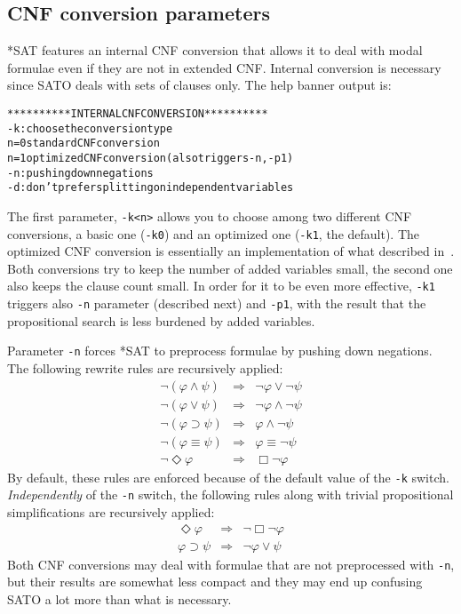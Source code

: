\documentclass[12pt]{report}
\begin{document}
\subsection{CNF conversion parameters}
\label{sub:cnf_conv}

*SAT features an internal CNF conversion that allows it to deal with
 modal formulae even if they are not in extended CNF. Internal
 conversion is necessary since SATO deals with sets of clauses only.
The help banner output is:
\begin{alltt}
\footnotesize
********** INTERNAL CNF CONVERSION **********
   -k       : choose the conversion type
              n=0 standard CNF conversion
              n=1 optimized CNF conversion (also triggers -n, -p1)
   -n       : pushing down negations
   -d       : don't prefer splitting on independent variables
\end{alltt}

The first parameter, {\tt -k<n>} allows you to choose among two
different CNF conversions, a basic one ({\tt -k0}) and an
optimized one ({\tt -k1}, the default). The optimized CNF conversion is essentially
an implementation of what described in~\cite{pla86a}. 
Both conversions try to keep the number of
added variables small, the second one also keeps the clause count
small. In order for it to be even more effective, {\tt -k1} triggers
also {\tt -n} parameter (described next) and {\tt -p1}, with the
result that the propositional search is less burdened by added
variables.

Parameter {\tt -n} forces *SAT to preprocess formulae by pushing down
negations. The following rewrite rules are recursively applied:
\[
\begin{array}{rcl}
\neg (\varphi \wedge \psi) & \Rightarrow & 
	\neg \varphi \vee \neg \psi \\
\neg (\varphi \vee \psi) & \Rightarrow & 
	\neg \varphi \wedge \neg \psi \\
\neg (\varphi \supset \psi) & \Rightarrow & 
	\varphi \wedge \neg \psi\\
\neg (\varphi \equiv \psi) & \Rightarrow & 
	\varphi \equiv \neg \psi\\
\neg \Diamond \varphi & \Rightarrow & \Box \neg \varphi 
\end{array}
\]
By default, these rules are enforced because of the default value of
the {\tt -k} switch. \textit{Independently} of
the {\tt -n} switch, the following rules along with trivial propositional
simplifications are recursively applied:
\[
\begin{array}{rcl}
\Diamond \varphi & \Rightarrow & \neg \Box \neg \varphi \\
\varphi \supset \psi & \Rightarrow & 	\neg \varphi \vee \psi
\end{array}
\]
Both CNF conversions may
deal with formulae that are not preprocessed with {\tt -n}, 
but their results are
somewhat less compact and they may end up confusing SATO a lot more
than what is necessary.
\end{document}
